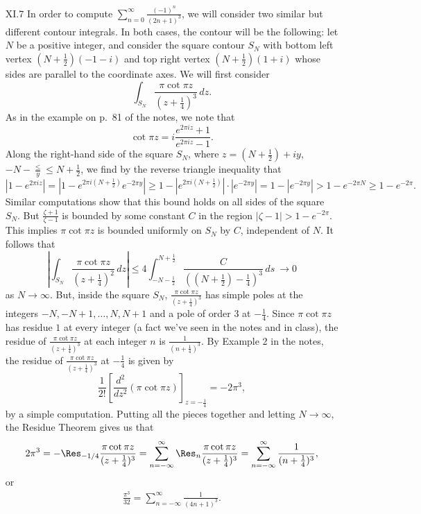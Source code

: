 \documentclass[11pt]{book}
\theoremstyle{definition}
\begin{document}
\begin{enumerate}
    \item[XI.7]  In order to compute $\sum_{n=0}^\infty \frac{(-1)^n}{(2n+1)^3}$, we will consider two similar but different contour integrals.   In both cases, the contour will be the following: let $N$ be a positive integer, and consider the square contour $S_N$ with bottom left vertex $(N+\tfrac 1 2)(-1-i)$ and top right vertex $(N + \tfrac 1 2)(1+i)$ whose sides are parallel to the coordinate axes.   We will first consider 
    \[ \int_{S_N} \frac{\pi \cot \pi z}{(z+\tfrac 1 4)^3} \, dz .\]  As in the example on p.~81 of the notes, we note that 
    \[ \cot \pi z =  i \frac{e^{2\pi i z} +1}{e^{2\pi i z}-1}. \]   Along the right-hand side of the square $S_N$, where $z = (N+\tfrac 1 2) + iy$, $-N-\tfrac \leq y \leq N + \tfrac 1 2$, we find by the reverse triangle inequality that 
    \[ | 1-  e^{2\pi i z} | = |1 - e^{2\pi i (N+\tfrac 1 2)} e^{-2\pi y} |  \geq 1 - |e^{2\pi i (N+\tfrac 1 2)} | \cdot |  e^{-2\pi y}|  = 1 - |e^{-2\pi y}| >  1 - e^{-2\pi N} \geq 1 - e^{-2\pi}. \]  Similar computations show that this bound holds on all sides of the square $S_N$.  But $\frac{\zeta + 1}{\zeta -1}$ is bounded by some constant $C$ in the region $|\zeta - 1| > 1-e^{-2\pi}$.  This implies $\pi \cot \pi z$ is bounded uniformly on $S_N$ by $C$, independent of $N$.  It follows that 
    \[ \left| \int_{S_N} \frac{\pi \cot \pi z}{(z+\tfrac{1}{4})^2} \, dz \right| \leq 4 \int_{-N-\tfrac 1 2}^{N+\tfrac 1 2} \frac{C}{( (N+\tfrac 1 2) - \tfrac 1 4)^3} \, ds \ \to 0 \] as $N\to \infty$.   But, inside the square $S_N$, $\frac{\pi \cot \pi z}{(z+\tfrac 1 4)^3}$ has simple poles at the integers $-N, -N+1, \ldots, N, N+1$ and a pole of order $3$ at $-\tfrac 1 4$.  Since $\pi \cot \pi z$ has residue $1$ at every integer (a fact we've seen in the notes and in class), the residue of $\frac{\pi \cot \pi z}{(z+\tfrac 1 4)^3}$ at each integer $n$ is $\frac{1}{(n + \tfrac 1 4)^3}$.   By Example 2 in the notes, the residue of $\frac{\pi \cot \pi z}{(z+\tfrac 1 4)^3}$ at $-\tfrac 1 4$  is given by 
    \[ \frac{1}{2!} \left[ \frac{d^2}{dz^2} ( \pi \cot \pi z ) \right] _{z=-\tfrac 1 4} = -2\pi^3, \] by a simple computation.   Putting all the pieces together and letting $N\to \infty$, the Residue Theorem gives us that 
    \[ 2\pi^3 = - \Res_{-1/4} \frac{\pi \cot \pi z}{(z+\tfrac 1 4)^3} = \sum_{n=-\infty}^\infty \Res_n \frac{\pi \cot \pi z}{(z+\tfrac 1 4)^3} = \sum_{n= -\infty}^\infty \frac{1}{(n+\tfrac 1 4)^3} ,\]  or 
    \begin{align} \frac{\pi^3}{32} = \sum_{n=-\infty}^\infty \frac{1}{(4n+1)^3}. \label{eq1} \end{align} 

\end{enumerate}
\end{document}
